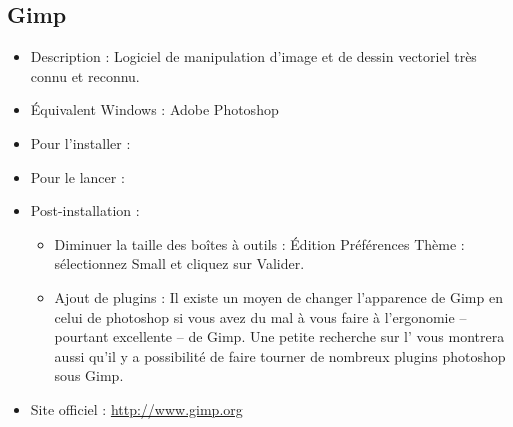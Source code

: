 \subsection{Gimp}
\label{RefInstallGimp}
\begin{itemize}
\begingroup
{}
\item Description : Logiciel de manipulation d'image et de dessin vectoriel très connu et reconnu.{\par}
\item Équivalent Windows : Adobe Photoshop{\par}
\item Pour l'installer : 
\item Pour le lancer : 
\item Post-installation :{\par}
\begin{itemize}
\item Diminuer la taille des boîtes à outils : Édition \FlecheDroite Préférences \FlecheDroite Thème : sélectionnez Small et cliquez sur Valider.{\par}
\item Ajout de plugins : Il existe un moyen de changer l'apparence de Gimp en celui de photoshop si vous avez du mal à vous faire à l'ergonomie -- pourtant excellente -- de Gimp. Une petite recherche sur l' vous montrera aussi qu'il y a possibilité de faire tourner de nombreux plugins photoshop sous Gimp.{\par}
\endgroup
\end{itemize}
\item Site officiel : \url{http://www.gimp.org}{\par}
\end{itemize}
\newpage
